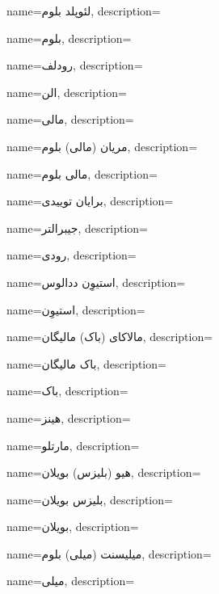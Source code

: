 {
name={لئوپلد بلوم},
description={}
}

{
name={بلوم},
description={}
}

{
name={رودلف},
description={}
}

{
name={الن},
description={}
}

{
name={مالی},
description={}
}

{
name={مریان (مالی) بلوم},
description={}
}

{
name={مالی بلوم},
description={}
}

{
name={برایان توییدی},
description={}
}

{
name={جیبرالتر},
description={}
}

{
name={رودی},
description={}
}

{
name={استیوِن ددالوس},
description={}
}

{
name={استیوِن},
description={}
}

{
name={مالاکای (باک)  مالیگان},
description={}
}

{
name={باک مالیگان},
description={}
}

{
name={باک},
description={}
}

{
name={هینز},
description={}
}

{
name={مارتلو},
description={}
}

{
name={هیو (بلیزس) بویلان},
description={}
}

{
name={بلیزس بویلان},
description={}
}

{
name={بویلان},
description={}
}

{
name={میلیسنت (میلی) بلوم},
description={}
}

{
name={میلی},
description={}
}

